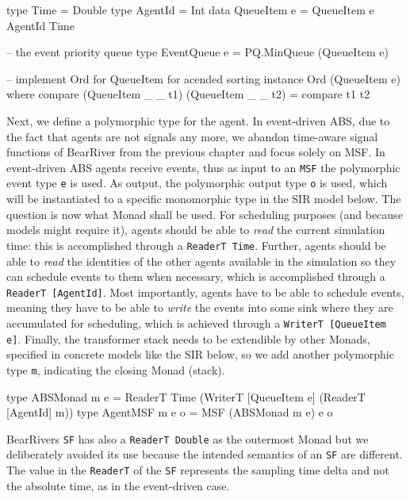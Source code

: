 \begin{HaskellCode}
type Time        = Double
type AgentId     = Int
data QueueItem e = QueueItem e AgentId Time

-- the event priority queue
type EventQueue e = PQ.MinQueue (QueueItem e)

-- implement Ord for QueueItem for acended sorting
instance Ord (QueueItem e) where
  compare (QueueItem _ _ t1) (QueueItem _ _ t2) = compare t1 t2
\end{HaskellCode}

Next, we define a polymorphic type for the agent. In event-driven ABS, due to the fact that agents are not signals any more, we abandon time-aware signal functions of BearRiver from the previous chapter and focus solely on MSF. In event-driven ABS agents receive events, thus as input to an \texttt{MSF} the polymorphic event type \texttt{e} is used. As output, the polymorphic output type \texttt{o} is used, which will be instantiated to a specific monomorphic type in the SIR model below. The question is now what Monad shall be used. For scheduling purposes (and because models might require it), agents should be able to \textit{read} the current simulation time: this is accomplished through a \texttt{ReaderT Time}. Further, agents should be able to \textit{read} the identities of the other agents available in the simulation so they can schedule events to them when necessary, which is accomplished through a \texttt{ReaderT [AgentId]}. Most importantly, agents have to be able to schedule events, meaning they have to be able to \textit{write} the events into some sink where they are accumulated for scheduling, which is achieved through a \texttt{WriterT [QueueItem e]}. Finally, the transformer stack needs to be extendible by other Monads, specified in concrete models like the SIR below, so we add another polymorphic type \texttt{m}, indicating the closing Monad (stack).

\begin{HaskellCode}
type ABSMonad m e   = ReaderT Time (WriterT [QueueItem e] (ReaderT [AgentId] m))
type AgentMSF m e o = MSF (ABSMonad m e) e o
\end{HaskellCode}

BearRivers \texttt{SF} has also a \texttt{ReaderT Double} as the outermost Monad but we deliberately avoided its use because the intended semantics of an \texttt{SF} are different. The value in the \texttt{ReaderT} of the \texttt{SF} represents the sampling time delta and not the absolute time, as in the event-driven case.

